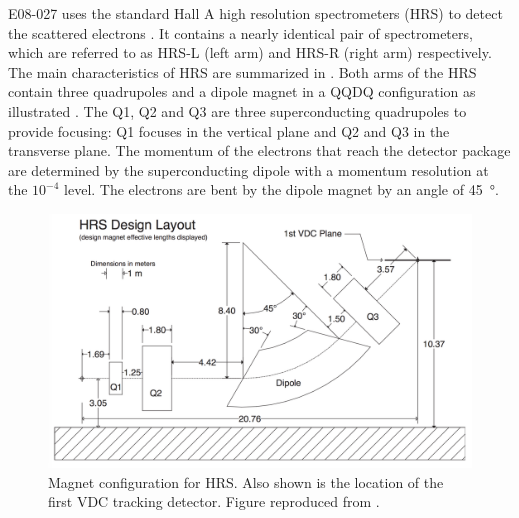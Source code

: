 E08-027 uses the standard Hall A high resolution spectrometers (HRS) to detect the scattered electrons \cite{Alcorn2004}. It contains a nearly identical pair of spectrometers, which are referred to as HRS-L (left arm) and HRS-R (right arm) respectively. The main characteristics of HRS are summarized in . Both arms of the HRS contain three quadrupoles and a dipole magnet in a QQDQ configuration as illustrated . The Q1, Q2 and Q3 are three superconducting quadrupoles to provide focusing: Q1 focuses in the vertical plane and Q2 and Q3 in the transverse plane. The momentum of the electrons that reach the detector package are determined by the superconducting dipole with a momentum resolution at the $10^{-4}$ level. The electrons are bent by the dipole magnet by an angle of \SI{45}{\degree}.

\begin{figure}[p!]
  \centering
  \includegraphics[width=\textwidth]{figs/HRS.png}
  \caption[Magnet configuration for HRS.]{Magnet configuration for HRS. Also shown is the location of the first VDC tracking detector. Figure reproduced from \cite{Alcorn2004}. \label{C5S4F1}}
\end{figure}


